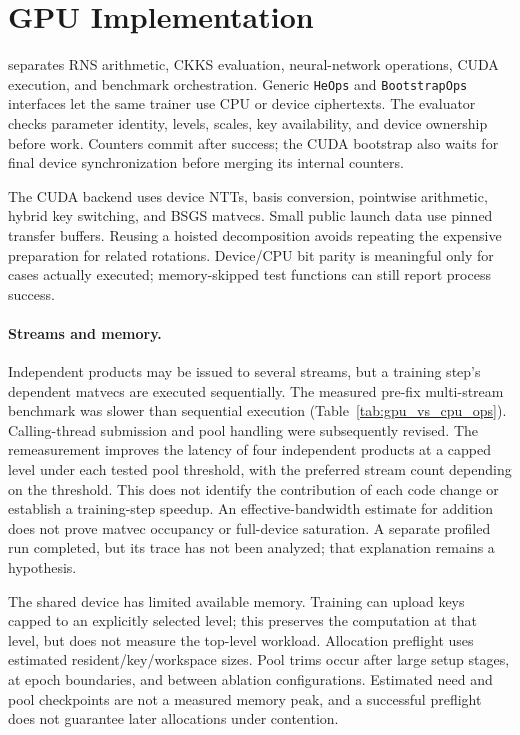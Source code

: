 \section{GPU Implementation}
\label{sec:gpu}
\sys{} separates RNS arithmetic, CKKS evaluation, neural-network operations, CUDA execution, and benchmark orchestration. Generic \texttt{HeOps} and \texttt{BootstrapOps} interfaces let the same trainer use CPU or device ciphertexts. The evaluator checks parameter identity, levels, scales, key availability, and device ownership before work. Counters commit after success; the CUDA bootstrap also waits for final device synchronization before merging its internal counters.

The CUDA backend uses device NTTs, basis conversion, pointwise arithmetic, hybrid key switching, and BSGS matvecs. Small public launch data use pinned transfer buffers. Reusing a hoisted decomposition avoids repeating the expensive preparation for related rotations. Device/CPU bit parity is meaningful only for cases actually executed; memory-skipped test functions can still report process success.

\paragraph{Streams and memory.}
Independent products may be issued to several streams, but a training step's dependent matvecs are executed sequentially. The measured pre-fix multi-stream benchmark was slower than sequential execution (Table~\ref{tab:gpu_vs_cpu_ops}). Calling-thread submission and pool handling were subsequently revised. The remeasurement improves the latency of four independent products at a capped level under each tested pool threshold, with the preferred stream count depending on the threshold. This does not identify the contribution of each code change or establish a training-step speedup. An effective-bandwidth estimate for addition does not prove matvec occupancy or full-device saturation. A separate profiled run completed, but its trace has not been analyzed; that explanation remains a hypothesis.

The shared device has limited available memory. Training can upload keys capped to an explicitly selected level; this preserves the computation at that level, but does not measure the top-level workload. Allocation preflight uses estimated resident/key/workspace sizes. Pool trims occur after large setup stages, at epoch boundaries, and between ablation configurations. Estimated need and pool checkpoints are not a measured memory peak, and a successful preflight does not guarantee later allocations under contention.

